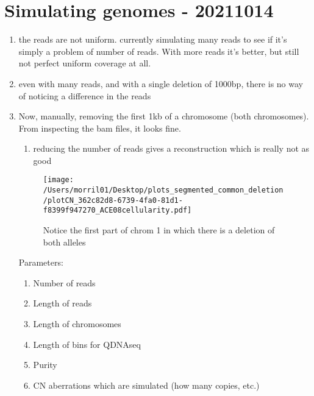 \documentclass[11pt,a4paper,roman]{article}
\begin{document}
\clearpage

\section{Simulating genomes - 20211014}
\begin{enumerate}
\item the reads are not uniform. currently simulating many reads to see if it's simply a problem of number of reads. With more reads it's better, but still not perfect uniform coverage at all.
\item even with many reads, and with a single deletion of 1000bp, there is no way of noticing a difference in the reads
\item Now, manually, removing the first 1kb of a chromosome (both chromosomes). From inspecting the bam files, it looks fine.
\begin{enumerate}
\item reducing the number of reads gives a reconstruction which is really not as good
\end{enumerate}

\begin{figure}[h]
\centering
\texttt{[image: /Users/morril01/Desktop/plots\_segmented\_common\_deletion/plotCN\_362c82d8-6739-4fa0-81d1-f8399f947270\_ACE08cellularity.pdf]}
\caption{Notice the first part of chrom 1 in which there is a deletion of both alleles}
\end{figure}

Parameters:
\begin{enumerate}
\item Number of reads
\item Length of reads
\item Length of chromosomes
\item Length of bins for QDNAseq
\item Purity
\item CN aberrations which are simulated (how many copies, etc.)
\end{enumerate}




\end{enumerate}
\end{document}
